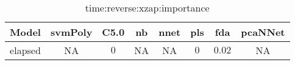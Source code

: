 \begin{table}[!ht]
	\centering
	\begin{tabular}{|c|c|c|c|c|c|c|c|}
		\hline
		Model & svmPoly & C5.0 & nb & nnet & pls & fda & pcaNNet \\ \hline
		elapsed & NA & $0$ & NA & NA & $0$ & $0.02$ & NA \\ \hline
	\end{tabular}
	\caption{time:reverse:xzap:importance}
	\label{tab:time:reverse:xzap:importance}
\end{table}
